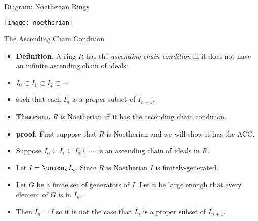 \documentclass[handout]{beamer}
\begin{document}

\begin{frame}{Diagram: Noetherian Rings}

\begin{center}
\texttt{[image: noetherian]}
\end{center}

\end{frame}



\begin{frame}{The Ascending Chain Condition}

\begin{itemize}
  \item \textbf{Definition.} A ring $R$ has the \emph{ascending chain condition} iff it does not have an infinite
  ascending chain of ideals:
  \item $I_0 \subset  I_1 \subset I_2 \subset \cdots$
  \item such that each $I_n$ is a proper subset of $I_{n+1}$.
  \item \textbf{Theorem.} $R$ is Noetherian iff it has the ascending chain condition.
  \item \textbf{proof.} First suppose that $R$ is Noetherian and we will show it has the ACC.
  \item  Suppose $I_0 \subseteq  I_1 \subseteq I_2 \subseteq \cdots$ is an ascending chain of ideals in $R$.
  \item Let $I=\union_n I_n$. Since $R$ is Noetherian $I$ is finitely-generated.
  \item Let $G$ be a finite set of generators of $I$. Let $n$ be large enough that every element of $G$ is in $I_n$.
  \item Then $I_n=I$ so it is not the case that $I_n$ is a proper subset of $I_{n+1}$.
\end{itemize}

\end{frame}


\end{document}
